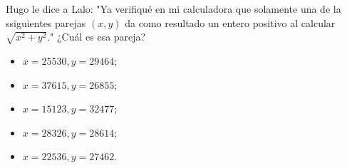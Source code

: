 Hugo le dice a Lalo: "Ya verifiqué en mi calculadora que solamente una de la ssiguientes parejas $(x,y)$ da como resultado un entero positivo al calcular $\sqrt{x^2+y^2}$." ¿Cuál es esa pareja?

 \begin{itemize} 
 \item  $x = 25530, y = 29464$;
 \item  $x = 37615, y = 26855$;
 \item  $x = 15123, y = 32477$;
 \item  $x = 28326, y = 28614$;
 \item  $x = 22536, y = 27462$.
 \end{itemize} 